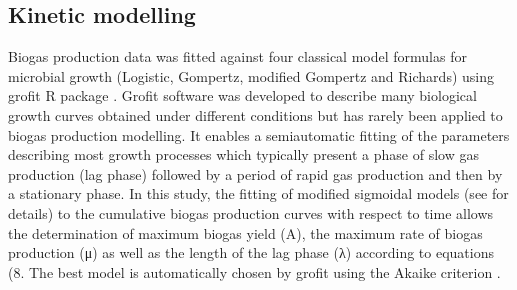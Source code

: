 \subsection{Kinetic modelling}
Biogas production data was fitted against four classical model formulas for microbial growth (Logistic, Gompertz, modified Gompertz and Richards) using grofit R package \cite{Kahm_2010}. Grofit software was developed to describe many biological growth curves obtained under different conditions but has rarely been applied to biogas production modelling. It enables a semiautomatic fitting of the parameters describing most growth processes which typically present a phase of slow gas production (lag phase) followed by a period of rapid gas production and then by a stationary phase. In this study, the fitting of modified sigmoidal models (see \cite{Zwietering1990} for details) to the cumulative biogas production curves  with respect to time allows the determination of maximum biogas yield (A), the maximum rate of biogas production (μ) as well as the length of the lag phase (λ) according to equations (8. The best model is automatically chosen by grofit using the Akaike criterion \cite{Hasenbrink_2006}.
